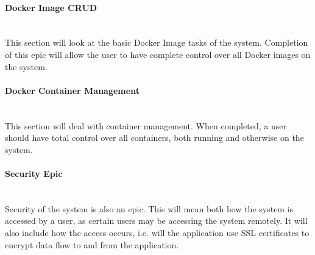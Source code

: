 \newpage
\paragraph{Docker Image CRUD}\mbox{}\\
This section will look at the basic Docker Image tasks of the system. Completion of this epic will allow the user to have complete control over all Docker images on the system.

\begin{figure}[!htbp]
\centering
{}
\end{figure}

\paragraph{Docker Container Management}\mbox{}\\
This section will deal with container management. When completed, a user should have total control over all containers, both running and otherwise on the system.

\begin{figure}[!htbp]
\centering
{}
\end{figure}

\newpage
\paragraph{Security Epic}\mbox{}\\
Security of the system is also an epic. This will mean both how the system is accessed by a user, as certain users may be accessing the system remotely. It will also include how the access occurs, i.e. will the application use SSL certificates to encrypt data flow to and from the application.

